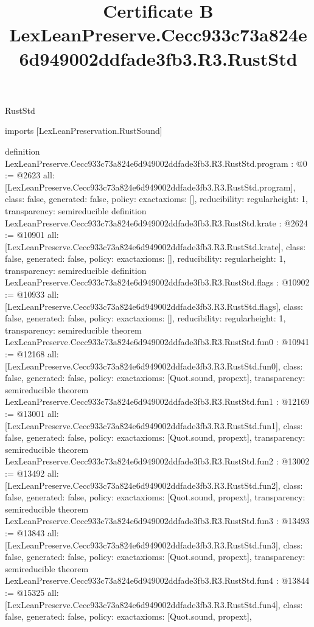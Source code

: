 \begin{lexlean}{RustStd}
\title{Certificate B LexLeanPreserve.Cecc933c73a824e6d949002ddfade3fb3.R3.RustStd}
\begin{coremodule}
imports [LexLeanPreservation.RustSound]

definition LexLeanPreserve.Cecc933c73a824e6d949002ddfade3fb3.R3.RustStd.program : @0 := @2623 {
  all: [LexLeanPreserve.Cecc933c73a824e6d949002ddfade3fb3.R3.RustStd.program],
  class: false,
  generated: false,
  policy: exact{axioms: []},
  reducibility: regular{height: 1},
  transparency: semireducible
}
definition LexLeanPreserve.Cecc933c73a824e6d949002ddfade3fb3.R3.RustStd.krate : @2624 := @10901 {
  all: [LexLeanPreserve.Cecc933c73a824e6d949002ddfade3fb3.R3.RustStd.krate],
  class: false,
  generated: false,
  policy: exact{axioms: []},
  reducibility: regular{height: 1},
  transparency: semireducible
}
definition LexLeanPreserve.Cecc933c73a824e6d949002ddfade3fb3.R3.RustStd.flags : @10902 := @10933 {
  all: [LexLeanPreserve.Cecc933c73a824e6d949002ddfade3fb3.R3.RustStd.flags],
  class: false,
  generated: false,
  policy: exact{axioms: []},
  reducibility: regular{height: 1},
  transparency: semireducible
}
theorem LexLeanPreserve.Cecc933c73a824e6d949002ddfade3fb3.R3.RustStd.fun0 : @10941 := @12168 {
  all: [LexLeanPreserve.Cecc933c73a824e6d949002ddfade3fb3.R3.RustStd.fun0],
  class: false,
  generated: false,
  policy: exact{axioms: [Quot.sound, propext]},
  transparency: semireducible
}
theorem LexLeanPreserve.Cecc933c73a824e6d949002ddfade3fb3.R3.RustStd.fun1 : @12169 := @13001 {
  all: [LexLeanPreserve.Cecc933c73a824e6d949002ddfade3fb3.R3.RustStd.fun1],
  class: false,
  generated: false,
  policy: exact{axioms: [Quot.sound, propext]},
  transparency: semireducible
}
theorem LexLeanPreserve.Cecc933c73a824e6d949002ddfade3fb3.R3.RustStd.fun2 : @13002 := @13492 {
  all: [LexLeanPreserve.Cecc933c73a824e6d949002ddfade3fb3.R3.RustStd.fun2],
  class: false,
  generated: false,
  policy: exact{axioms: [Quot.sound, propext]},
  transparency: semireducible
}
theorem LexLeanPreserve.Cecc933c73a824e6d949002ddfade3fb3.R3.RustStd.fun3 : @13493 := @13843 {
  all: [LexLeanPreserve.Cecc933c73a824e6d949002ddfade3fb3.R3.RustStd.fun3],
  class: false,
  generated: false,
  policy: exact{axioms: [Quot.sound, propext]},
  transparency: semireducible
}
theorem LexLeanPreserve.Cecc933c73a824e6d949002ddfade3fb3.R3.RustStd.fun4 : @13844 := @15325 {
  all: [LexLeanPreserve.Cecc933c73a824e6d949002ddfade3fb3.R3.RustStd.fun4],
  class: false,
  generated: false,
  policy: exact{axioms: [Quot.sound, propext]},
}
\end{coremodule}
\end{lexlean}
